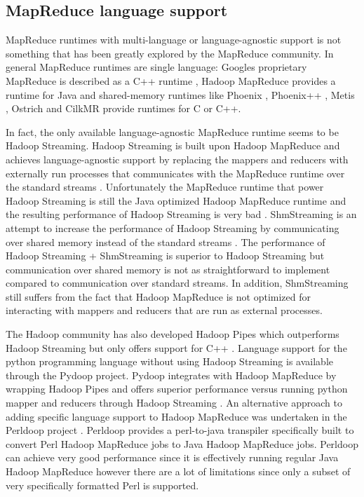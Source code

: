\documentclass[11pt]{article}       %
\begin{document}
\subsection{MapReduce language support}

MapReduce runtimes with multi-language or language-agnostic support is not something that has been greatly explored by the MapReduce community.
In general MapReduce runtimes are single language: Googles proprietary MapReduce is described as a C++ runtime \cite{GoogleMapReduce}, Hadoop MapReduce provides a runtime for Java \cite{Hadoop} and shared-memory runtimes like Phoenix \cite{Phoenix},
Phoenix++ \cite{Phoenix++}, Metis \cite{Metis}, Ostrich \cite{Ostrich} and
CilkMR \cite{CilkMR} provide runtimes for C or C++.

In fact, the only available language-agnostic MapReduce runtime seems to be Hadoop Streaming.
Hadoop Streaming is built upon Hadoop MapReduce and achieves language-agnostic support by replacing the mappers and reducers with externally run processes that communicates with the MapReduce runtime over the standard streams \cite{HadoopStreaming}.
Unfortunately the MapReduce runtime that power Hadoop Streaming is still the Java optimized Hadoop MapReduce runtime and the resulting performance of Hadoop Streaming is very bad \cite{HadoopStreamingPerf} \cite{Pydoop} \cite{Perldoop}.
ShmStreaming is an attempt to increase the performance of Hadoop Streaming by communicating over shared memory instead of the standard streams \cite{ShmStreaming}.
The performance of Hadoop Streaming + ShmStreaming is superior to Hadoop Streaming but communication over shared memory is not as straightforward to implement compared to communication over standard streams.
In addition, ShmStreaming still suffers from the fact that Hadoop MapReduce is not optimized for interacting with mappers and reducers that are run as external processes.

The Hadoop community has also developed Hadoop Pipes which outperforms Hadoop Streaming but only offers support for C++ \cite{HadoopPipes}.
Language support for the python programming language without using Hadoop Streaming is available through the Pydoop project.
Pydoop integrates with Hadoop MapReduce by wrapping Hadoop Pipes and offers superior performance versus running python mapper and reducers through Hadoop Streaming \cite{Pydoop}.
An alternative approach to adding specific language support to Hadoop MapReduce was undertaken in the Perldoop project \cite{Perldoop}.
Perldoop provides a perl-to-java transpiler specifically built to convert Perl Hadoop MapReduce jobs to Java Hadoop MapReduce jobs.
Perldoop can achieve very good performance since it is effectively running regular Java Hadoop MapReduce however there are a lot of limitations since only a subset of very specifically formatted Perl is supported.
\end{document}
